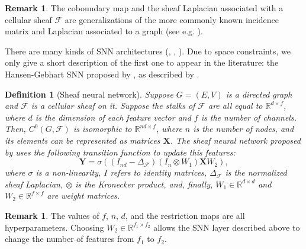 \documentclass[11pt,a4paper,openright,twoside]{report}
\newcounter{mycounter}
\theoremstyle{plain}
\newtheorem{definition}[mycounter]{Definition}
\theoremstyle{definition}
\newtheorem{remark}[mycounter]{Remark}
\begin{document}
\begin{remark}
  The coboundary map and the sheaf Laplacian associated with a cellular sheaf $\mathcal{F}$ are generalizations of the more commonly known incidence matrix and Laplacian associated to a graph (see e.g. \cite{ward2022practical}).
\end{remark}

There are many kinds of SNN architectures (\cite{hansen2020sheaf}, \cite{bodnar2022neural}, \cite{zaghen2024nonlinear}). Due to space constraints, we only give a short description of the first one to appear in the literature: the Hansen-Gebhart SNN proposed by \cite{hansen2020sheaf}, as described by \cite{zaghen2024nonlinear}.

\begin{definition}[Sheaf neural network]
  \label{def: sheafnn}
  Suppose $G = (E,V)$ is a directed graph and $\mathcal{F}$ is a cellular sheaf on it. Suppose the stalks of $\mathcal{F}$ are all equal to $\mathbb{R}^{d \times f}$, where $d$ is the dimension of each feature vector and $f$ is the number of channels. Then, $C^0(G, \mathcal{F})$ is isomorphic to $\mathbb{R}^{nd \times f}$, where $n$ is the number of nodes, and its elements can be represented as matrices $\mathbf{X}$. The sheaf neural network proposed by \cite{hansen2020sheaf} uses the following transition function to update this features:
  \[\mathbf{Y} = \sigma((I_{nd} - \Delta_{\mathcal{F}})(I_{n} \otimes W_1)\mathbf{X}W_2),\]
  where $\sigma$ is a non-linearity, $I$ refers to identity matrices, $\Delta_{\mathcal{F}}$ is the normalized sheaf Laplacian, $\otimes$ is the Kronecker product, and, finally, $W_1 \in \mathbb{R}^{d \times d}$ and $W_2 \in \mathbb{R}^{f \times f}$ are weight matrices.
\end{definition}

\begin{remark}
  The values of $f$, $n$, $d$, and the restriction maps are all hyperparameters.
  Choosing $W_2 \in \mathbb{R}^{f_1 \times f_2}$ allows the SNN layer described above to change the number of features from $f_1$ to $f_2$.  
\end{remark}
\end{document}
